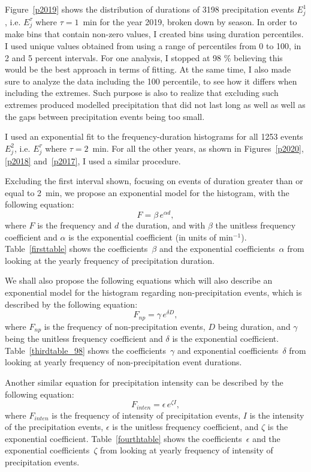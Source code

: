 \documentclass[11pt]{report}
\begin{document}
Figure~\ref{p2019} shows the distribution of durations of 3198
precipitation events $E_j^1$, i.e. $E_j^\tau$ where $\tau=1$~min for
the year 2019, broken down by season. In order to make bins that contain non-zero values, I created bins using duration percentiles. I used unique values obtained from using a range of percentiles from 0 to 100, in 2 and 5 percent intervals. For one analysis, I stopped at 98 \% believing this would be the best approach in terms of fitting. At the same time, I also made sure to analyze the data including the 100 percentile, to see how it differs when including the extremes. Such purpose is also to realize that excluding such extremes produced modelled precipitation that did not last long as well as well as the gaps between precipitation events being too small.  

I used an exponential fit to the
frequency-duration histograms for all 1253 events $E_j^2$,
i.e. $E_j^\tau$ where $\tau=2$~min. For all the other years, as shown
in Figures~\ref{p2020}, \ref{p2018} and~\ref{p2017}, I used a similar
procedure.

Excluding the first interval shown, focusing on events of duration
greater than or equal to 2~min, we propose an exponential model for
the histogram, with the following equation:
\begin{equation}\label{expod}
  F = \beta \,e^{\alpha d},
\end{equation}
where $F$ is the frequency and $d$ the duration, and with $\beta$ the
unitless frequency coefficient and $\alpha$ is the exponential
coefficient (in units of min$^{-1}$). Table~\ref{firsttable} shows the
coefficients~$\beta$ and the exponential coefficients~$\alpha$ from
looking at the yearly frequency of precipitation duration.

We shall also propose the following equations which will also describe an exponential model for the histogram regarding non-precipitation events, which is described by the following equation: 
\begin{equation}\label{expod_np}
	F_{np} = \gamma \,e^{\delta D},
\end{equation}
where $F_{np}$ is the frequency of non-precipitation events, $D$ being duration, and $\gamma $ being the unitless frequency coefficient and $\delta $ is the exponential coefficient. Table~\ref{thirdtable_98} shows the coefficients~$\gamma$ and exponential coefficients~$\delta$ from looking at yearly frequency of non-precipitation event durations. 

Another similar equation for precipitation intensity can be described by the following equation: 
\begin{equation}\label{expod_inten}
	F_{inten} = \epsilon \,e^{\zeta I},
\end{equation}
where $F_{inten}$ is the frequency of intensity of precipitation events, $I$ is the intensity of the precipitation events, $\epsilon$ is the unitless frequency coefficient, and $\zeta$ is the exponential coefficient. Table~\ref{fourthtable} shows the coefficients~$\epsilon$ and the exponential coefficients~$\zeta$ from looking at yearly frequency of intensity of precipitation events.  
\end{document}
